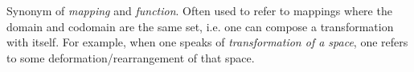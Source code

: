 \documentclass[12pt]{article}
\begin{document}
Synonym of {\em mapping} and {\em function}.  Often used to refer to mappings where the domain and 
codomain are the same set, i.e. one can compose a transformation with itself.  For example, when one 
speaks of {\em transformation of a space}, one refers to some deformation/rearrangement of that space.
\end{document}

